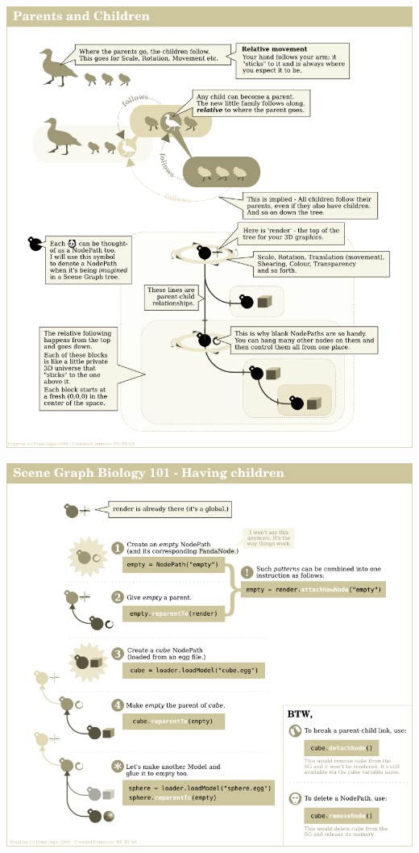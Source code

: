 \documentclass[a4paper,10pt]{book}
\begin{document}
\begin{center}
\includegraphics[scale=0.8]{Parenting.png} 
\end{center}

\begin{center}
\includegraphics[scale=0.8]{Parenting2.png} 
\end{center}
\end{document}
